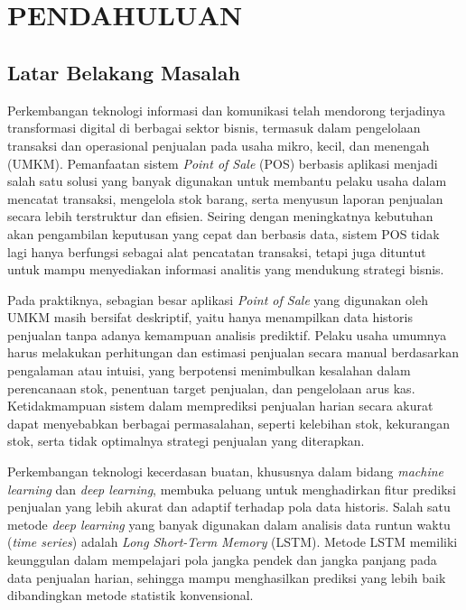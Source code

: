 \chapter[PENDAHULUAN]{\\ PENDAHULUAN}

\section{Latar Belakang Masalah}
Perkembangan teknologi informasi dan komunikasi telah mendorong terjadinya transformasi digital di berbagai sektor bisnis, termasuk dalam pengelolaan transaksi dan operasional penjualan pada usaha mikro, kecil, dan menengah (UMKM). Pemanfaatan sistem \textit{Point of Sale} (POS) berbasis aplikasi menjadi salah satu solusi yang banyak digunakan untuk membantu pelaku usaha dalam mencatat transaksi, mengelola stok barang, serta menyusun laporan penjualan secara lebih terstruktur dan efisien. Seiring dengan meningkatnya kebutuhan akan pengambilan keputusan yang cepat dan berbasis data, sistem POS tidak lagi hanya berfungsi sebagai alat pencatatan transaksi, tetapi juga dituntut untuk mampu menyediakan informasi analitis yang mendukung strategi bisnis.

Pada praktiknya, sebagian besar aplikasi \textit{Point of Sale} yang digunakan oleh UMKM masih bersifat deskriptif, yaitu hanya menampilkan data historis penjualan tanpa adanya kemampuan analisis prediktif. Pelaku usaha umumnya harus melakukan perhitungan dan estimasi penjualan secara manual berdasarkan pengalaman atau intuisi, yang berpotensi menimbulkan kesalahan dalam perencanaan stok, penentuan target penjualan, dan pengelolaan arus kas. Ketidakmampuan sistem dalam memprediksi penjualan harian secara akurat dapat menyebabkan berbagai permasalahan, seperti kelebihan stok, kekurangan stok, serta tidak optimalnya strategi penjualan yang diterapkan.

Perkembangan teknologi kecerdasan buatan, khususnya dalam bidang \textit{machine learning} dan \textit{deep learning}, membuka peluang untuk menghadirkan fitur prediksi penjualan yang lebih akurat dan adaptif terhadap pola data historis. Salah satu metode \textit{deep learning} yang banyak digunakan dalam analisis data runtun waktu (\textit{time series}) adalah \textit{Long Short-Term Memory} (LSTM). Metode LSTM memiliki keunggulan dalam mempelajari pola jangka pendek dan jangka panjang pada data penjualan harian, sehingga mampu menghasilkan prediksi yang lebih baik dibandingkan metode statistik konvensional.

